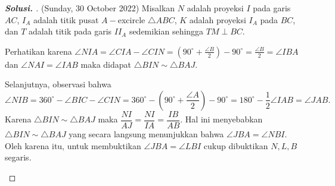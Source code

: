 \documentclass[letterpaper, 13pt]{scrartcl}
\begin{document}
\begin{proof}[\textbf{Solusi. }] (Sunday, 30 October 2022) Misalkan $N$ adalah proyeksi $I$ pada garis $AC$, $I_A$ adalah titik pusat $A-$excircle $\triangle ABC$, $K$ adalah proyeksi $I_A$ pada $BC$, dan $T$ adalah titik pada garis $II_A$ sedemikian sehingga $TM \perp BC$. 

Perhatikan karena $\angle NIA = \angle CIA - \angle CIN = (90^\circ+\frac{\angle B}{2})-90^\circ=\frac{\angle B}{2} = \angle IBA$ dan $\angle NAI = \angle IAB$ maka didapat $\triangle BIN \sim \triangle BAJ$.

Selanjutnya, observasi bahwa
$$\angle NIB = 360^\circ - \angle BIC - \angle CIN
            = 360^\circ - \left(90^\circ + \dfrac{\angle A}{2}\right) - 90^\circ
            = 180^\circ - \dfrac{1}{2}\angle IAB
            = \angle JAB.$$
Karena $\triangle BIN \sim \triangle BAJ$ maka $\dfrac{NI}{AJ}=\dfrac{NI}{IA}=\dfrac{IB}{AB}$. Hal ini menyebabkan $\triangle BIN \sim \triangle BAJ$ yang secara langsung menunjukkan bahwa $\angle JBA = \angle NBI$. Oleh karena itu, untuk membuktikan $\angle JBA = \angle LBI$ cukup dibuktikan $N,L,B$ segaris.
% 

\begin{center}
\end{center}
\end{proof}
\end{document}
